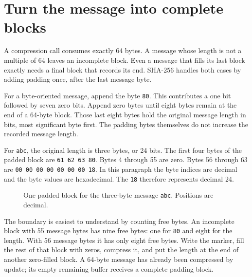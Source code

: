\section{Turn the message into complete blocks}
A compression call consumes exactly 64 bytes. A message whose length is not a multiple
of 64 leaves an incomplete block. Even a message that fills its last block exactly
needs a final block that records its end. SHA-256 handles both cases by adding padding
once, after the last message byte.

For a byte-oriented message, append the byte \texttt{80}. This contributes a one bit
followed by seven zero bits. Append zero bytes until eight bytes remain at the end of
a 64-byte block. Those last eight bytes hold the original message length in bits,
most significant byte first. The padding bytes themselves do not increase the recorded
message length.

For \texttt{abc}, the original length is three bytes, or 24 bits. The first four
bytes of the padded block are \texttt{61 62 63 80}. Bytes 4 through 55 are zero.
Bytes 56 through 63 are \texttt{00 00 00 00 00 00 00 18}. In this paragraph the
byte indices are decimal and the byte values are hexadecimal. The \texttt{18}
therefore represents decimal 24.

\begin{figure}[htbp]
\centering
{}
\caption{One padded block for the three-byte message \texttt{abc}. Positions are decimal.}
\end{figure}

The boundary is easiest to understand by counting free bytes. An incomplete block with
55 message bytes has nine free bytes: one for \texttt{80} and eight for the length.
With 56 message bytes it has only eight free bytes. Write the marker, fill the rest
of that block with zeros, compress it, and put the length at the end of another
zero-filled block. A 64-byte message has already been compressed by update; its
empty remaining buffer receives a complete padding block.

